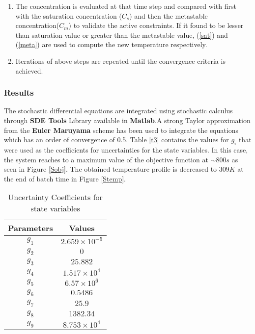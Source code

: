 \documentclass[3p,times,authoryear]{elsarticle}
\begin{document}
\begin{enumerate}
\item The concentration is evaluated  at that time step and compared with first with the saturation concentration ($C_{s}$) and then the metastable concentration($C_{m}$) to validate the active constraints. If it found to be lesser than saturation value or greater than the metastable value,  (\ref{sat}) and (\ref{meta}) are used to compute the new temperature respectively. 
\item Iterations of above steps are repeated until the convergence criteria is achieved.
\end{enumerate} 

\subsubsection{Results}
The stochastic differential equations are integrated using stochastic calculus through \textbf{SDE Tools} Library available in \textbf{Matlab}.A strong Taylor approximation from the \textbf{Euler Maruyama} scheme has been used to integrate the equations which has an order of convergence of 0.5. Table \ref{t3} contains the values for $g_{i}$ that were used as the coefficients for uncertainties for the state variables. In this case, the system reaches to a maximum value of the objective function at $\sim 800 s$ as seen in Figure \ref{Sobj}. The obtained temperature profile is decreased to $309 K$ at the end of batch time in Figure \ref{Stemp}. 
\begin{center}
\begin{table}[!h] 
\centering
\caption{Uncertainty Coefficients for state variables} \label{t3}
\begin{tabular}{|c|c|}
\hline
Parameters & Values \\
\hline
$g_{1}$ & $2.659\times10^{-5}$ \\
$g_{2}$ & $0$ \\
$g_{3}$ & $25.882$ \\
$g_{4}$ & $1.517\times10^{4}$ \\ 
$g_{5}$ & $6.57\times10^{6}$ \\
$g_{6}$ & $0.5486$ \\
$g_{7}$ & $25.9$\\
$g_{8}$ & $1382.34$ \\
$g_{9}$ & $8.753\times10^{4}$ \\
\hline
\end{tabular}

\label{Table2}
\end{table}
\end{center}
\end{document}
